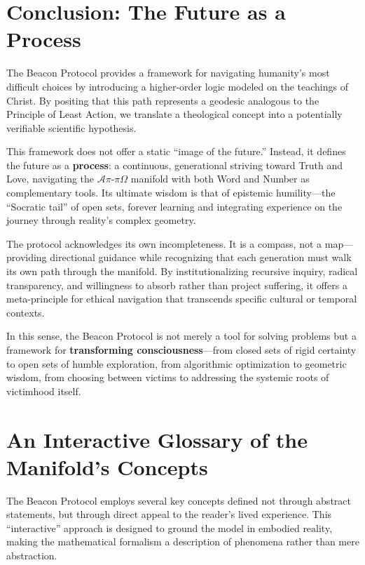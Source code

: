 \documentclass[11pt,a4paper]{article}
\begin{document}
\begin{small}
\section{Conclusion: The Future as a Process}
The Beacon Protocol provides a framework for navigating humanity's most difficult choices by introducing a higher-order logic modeled on the teachings of Christ. By positing that this path represents a geodesic analogous to the Principle of Least Action, we translate a theological concept into a potentially verifiable scientific hypothesis.

This framework does not offer a static ``image of the future.'' Instead, it defines the future as a \textbf{process}: a continuous, generational striving toward Truth and Love, navigating the $\mathcal{A}\pi\text{-}\pi\Omega$ manifold with both Word and Number as complementary tools. Its ultimate wisdom is that of epistemic humility—the ``Socratic tail'' of open sets, forever learning and integrating experience on the journey through reality's complex geometry.

The protocol acknowledges its own incompleteness. It is a compass, not a map—providing directional guidance while recognizing that each generation must walk its own path through the manifold. By institutionalizing recursive inquiry, radical transparency, and willingness to absorb rather than project suffering, it offers a meta-principle for ethical navigation that transcends specific cultural or temporal contexts.

In this sense, the Beacon Protocol is not merely a tool for solving problems but a framework for \textbf{transforming consciousness}—from closed sets of rigid certainty to open sets of humble exploration, from algorithmic optimization to geometric wisdom, from choosing between victims to addressing the systemic roots of victimhood itself.




\clearpage
\appendix

\section{An Interactive Glossary of the Manifold's Concepts}
\label{app:interactive_glossary}

The Beacon Protocol employs several key concepts defined not through abstract statements, but through direct appeal to the reader's lived experience. This ``interactive'' approach is designed to ground the model in embodied reality, making the mathematical formalism a description of phenomena rather than mere abstraction.


\end{small}
\end{document}
